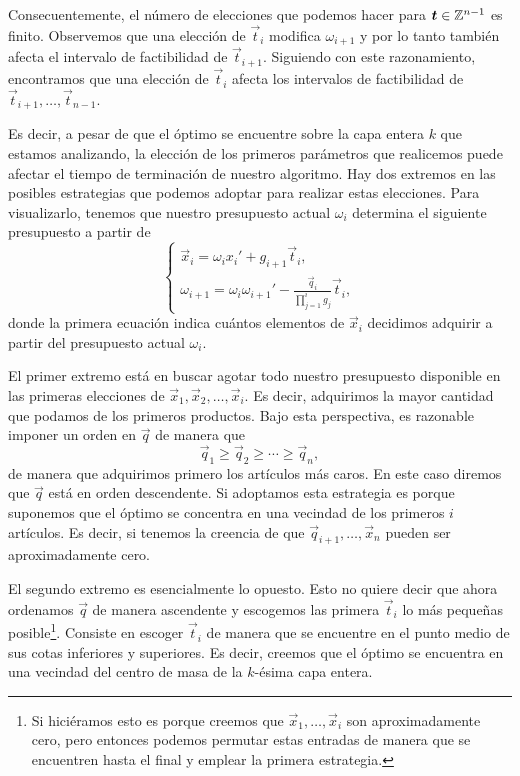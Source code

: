 Consecuentemente, el número de elecciones que podemos hacer para $\boldsymbol{t} \in \mathbb{Z}^{n-1}$ es finito.
Observemos que una elección de $\vec{t}_i$ modifica $\omega_{i+1}$ y por lo tanto también afecta el
intervalo de factibilidad de $\vec{t}_{i+1}$. Siguiendo con este razonamiento, encontramos que una
elección de $\vec{t}_i$ afecta los intervalos de factibilidad de $\vec{t}_{i+1}, \ldots,
\vec{t}_{n-1}$.

Es decir, a pesar de que el óptimo se encuentre sobre la capa entera $k$ que estamos analizando, la
elección de los primeros parámetros que realicemos puede afectar el tiempo de terminación de nuestro
algoritmo. Hay dos extremos en las posibles estrategias que podemos adoptar para realizar estas
elecciones. Para visualizarlo, tenemos que nuestro presupuesto actual $\omega_{i}$ determina el
siguiente presupuesto a partir de
\begin{equation*}
	\begin{cases}
		\vec{x}_i = \omega_ix_i' + g_{i+1}\vec{t}_i, \\
		\omega_{i+1} = \omega_i\omega_{i+1}' - \frac{\vec{q}_i}{\prod_{j=1}^{i}g_j}\vec{t}_i,
	\end{cases}
\end{equation*}
donde la primera ecuación indica cuántos elementos de $\vec{x}_i$ decidimos adquirir a partir del
presupuesto actual $\omega_i$.

El primer extremo está en buscar agotar todo nuestro presupuesto disponible en las primeras
elecciones de $\vec{x}_1, \vec{x}_2, \ldots, \vec{x}_i$. Es decir, adquirimos la mayor cantidad que
podamos de los primeros productos. Bajo esta perspectiva, es razonable imponer un orden en $\vec{q}$
de manera que
\begin{equation*}
	\vec{q}_1 \geq \vec{q}_2 \geq \cdots \geq \vec{q}_n,
\end{equation*}
de manera que adquirimos primero los artículos más caros. En este caso diremos que $\vec{q}$ está en
orden descendente. Si adoptamos esta estrategia es porque suponemos que el óptimo se concentra en
una vecindad de los primeros $i$ artículos. Es decir, si tenemos la creencia de que $\vec{q}_{i +
1}, \ldots, \vec{x}_n$ pueden ser aproximadamente cero.


El segundo extremo es esencialmente lo opuesto. Esto no quiere decir que ahora ordenamos $\vec{q}$
de manera ascendente y escogemos las primera $\vec{t}_i$ lo más pequeñas posible\footnote{Si
	hiciéramos esto es porque creemos que $\vec{x}_1, \ldots, \vec{x}_i$ son aproximadamente cero,
	pero entonces podemos permutar estas entradas de manera que se encuentren hasta el final y
emplear la primera estrategia.}. Consiste en escoger $\vec{t}_i$ de manera que se encuentre en el
punto medio de sus cotas inferiores y superiores. Es decir, creemos que el óptimo se encuentra en
una vecindad del centro de masa de la $k$-ésima capa entera.

